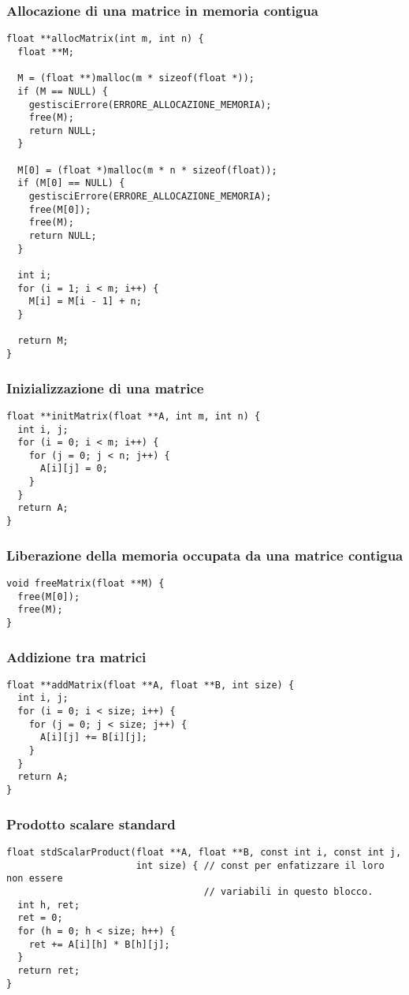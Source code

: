 \subsubsection{Allocazione di una matrice in memoria contigua}
\begin{lstlisting}
float **allocMatrix(int m, int n) {
  float **M;

  M = (float **)malloc(m * sizeof(float *));
  if (M == NULL) {
    gestisciErrore(ERRORE_ALLOCAZIONE_MEMORIA);
    free(M);
    return NULL;
  }

  M[0] = (float *)malloc(m * n * sizeof(float));
  if (M[0] == NULL) {
    gestisciErrore(ERRORE_ALLOCAZIONE_MEMORIA);
    free(M[0]);
    free(M);
    return NULL;
  }

  int i;
  for (i = 1; i < m; i++) {
    M[i] = M[i - 1] + n;
  }

  return M;
}
\end{lstlisting}
\subsubsection{Inizializzazione di una matrice}
\begin{lstlisting}
float **initMatrix(float **A, int m, int n) {
  int i, j;
  for (i = 0; i < m; i++) {
    for (j = 0; j < n; j++) {
      A[i][j] = 0;
    }
  }
  return A;
}
\end{lstlisting}

\subsubsection{Liberazione della memoria occupata da una matrice contigua}
\begin{lstlisting}
void freeMatrix(float **M) {
  free(M[0]);
  free(M);
}
\end{lstlisting}
\subsubsection{Addizione tra matrici}
\begin{lstlisting}
float **addMatrix(float **A, float **B, int size) {
  int i, j;
  for (i = 0; i < size; i++) {
    for (j = 0; j < size; j++) {
      A[i][j] += B[i][j];
    }
  }
  return A;
}
\end{lstlisting}

\subsubsection{Prodotto scalare standard}
\begin{lstlisting}
float stdScalarProduct(float **A, float **B, const int i, const int j,
                       int size) { // const per enfatizzare il loro non essere
                                   // variabili in questo blocco.
  int h, ret;
  ret = 0;
  for (h = 0; h < size; h++) {
    ret += A[i][h] * B[h][j];
  }
  return ret;
}
\end{lstlisting}
